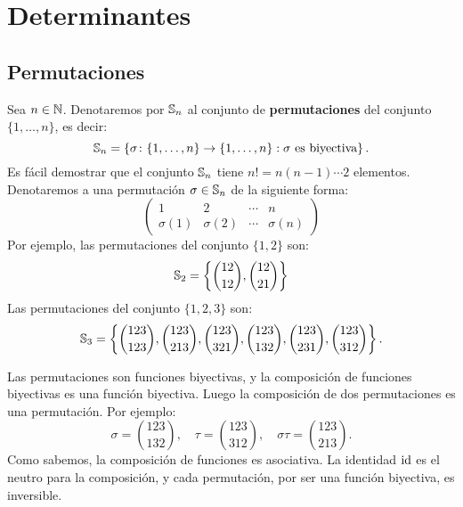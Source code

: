 
\chapter{Determinantes}

\section{Permutaciones}

\begin{block}
	Sea $n\in\mathbb{N}$. Denotaremos por $\mathbb{S}_n$ al conjunto de
	\textbf{permutaciones} del conjunto $\{1,\dots,n\}$, es decir:
	\[
		\mathbb{S}_n=\left\{\sigma\colon\{1,\dots,n\}\to\{1,\dots,n\}:\sigma\text{ es biyectiva}\right\}.	
	\]
	Es fácil demostrar que el conjunto $\mathbb{S}_n$ tiene $n!=n(n-1)\cdots2$ elementos. 
	Denotaremos a una permutación $\sigma\in\mathbb{S}_n$ de la siguiente forma:
	\[
	\begin{pmatrix}
		1 & 2 & \cdots & n\\
		\sigma(1) & \sigma(2) & \cdots & \sigma(n)
	\end{pmatrix}
	\]
	Por ejemplo, las permutaciones del conjunto $\{1,2\}$ son:
	\begin{gather*}
		\mathbb{S}_2=\left\{
		\binom{12}{12},
		\binom{12}{21}
		\right\}
	\end{gather*}
	Las permutaciones del conjunto $\{1,2,3\}$ son:
	\begin{gather*}
		\mathbb{S}_3=\left\{
		\binom{123}{123},
		\binom{123}{213},
		\binom{123}{321},
		\binom{123}{132},
		\binom{123}{231},
		\binom{123}{312}
		\right\}.
	\end{gather*}
\end{block}

\begin{block}
	Las permutaciones son funciones biyectivas, y la composición de funciones
	biyectivas es una función biyectiva. Luego la composición de dos
	permutaciones es una permutación. Por ejemplo: 
	\[
	\sigma=\binom{123}{132},\quad
	\tau=\binom{123}{312},\quad 
	\sigma\tau=\binom{123}{213}.
	\]
	Como sabemos, la composición de funciones es asociativa. La identidad $\operatorname{id}$
	es el neutro para la composición, y cada permutación, por ser una función
	biyectiva, es inversible.
\end{block}

